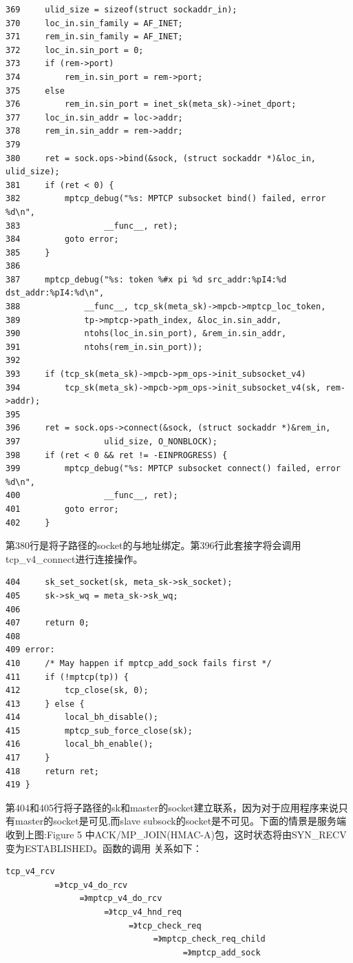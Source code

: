 \small\begin{verbatim}
369     ulid_size = sizeof(struct sockaddr_in);
370     loc_in.sin_family = AF_INET;
371     rem_in.sin_family = AF_INET;
372     loc_in.sin_port = 0;
373     if (rem->port)
374         rem_in.sin_port = rem->port;
375     else
376         rem_in.sin_port = inet_sk(meta_sk)->inet_dport;
377     loc_in.sin_addr = loc->addr;
378     rem_in.sin_addr = rem->addr;
379
380     ret = sock.ops->bind(&sock, (struct sockaddr *)&loc_in, ulid_size);
381     if (ret < 0) {
382         mptcp_debug("%s: MPTCP subsocket bind() failed, error %d\n",
383                 __func__, ret);
384         goto error;
385     }
386
387     mptcp_debug("%s: token %#x pi %d src_addr:%pI4:%d dst_addr:%pI4:%d\n",
388             __func__, tcp_sk(meta_sk)->mpcb->mptcp_loc_token,
389             tp->mptcp->path_index, &loc_in.sin_addr,
390             ntohs(loc_in.sin_port), &rem_in.sin_addr,
391             ntohs(rem_in.sin_port));
392
393     if (tcp_sk(meta_sk)->mpcb->pm_ops->init_subsocket_v4)
394         tcp_sk(meta_sk)->mpcb->pm_ops->init_subsocket_v4(sk, rem->addr);
395
396     ret = sock.ops->connect(&sock, (struct sockaddr *)&rem_in,
397                 ulid_size, O_NONBLOCK);
398     if (ret < 0 && ret != -EINPROGRESS) {
399         mptcp_debug("%s: MPTCP subsocket connect() failed, error %d\n",
400                 __func__, ret);
401         goto error;
402     }
\end{verbatim}\normalsize
第380行是将子路径的socket的与地址绑定。第396行此套接字将会调用tcp\_v4\_connect进行连接操作。
\small\begin{verbatim}
404     sk_set_socket(sk, meta_sk->sk_socket);
405     sk->sk_wq = meta_sk->sk_wq;
406
407     return 0;
408
409 error:
410     /* May happen if mptcp_add_sock fails first */
411     if (!mptcp(tp)) {
412         tcp_close(sk, 0);
413     } else {
414         local_bh_disable();
415         mptcp_sub_force_close(sk);
416         local_bh_enable();
417     }
418     return ret;
419 }
\end{verbatim}\normalsize
第404和405行将子路径的sk和master的socket建立联系，因为对于应用程序来说只有master的socket是可见,而slave subsock的socket是不可见。下面的情景是服务端收到上图:Figure 5 中ACK/MP\_JOIN(HMAC-A)包，这时状态将由SYN\_RECV变为ESTABLISHED。函数的调用
关系如下：
\small\begin{verbatim}
tcp_v4_rcv
          =》tcp_v4_do_rcv
               =》mptcp_v4_do_rcv
                    =》tcp_v4_hnd_req
                         =》tcp_check_req
                              =》mptcp_check_req_child
                                    =》mptcp_add_sock
\end{verbatim}\normalsize


